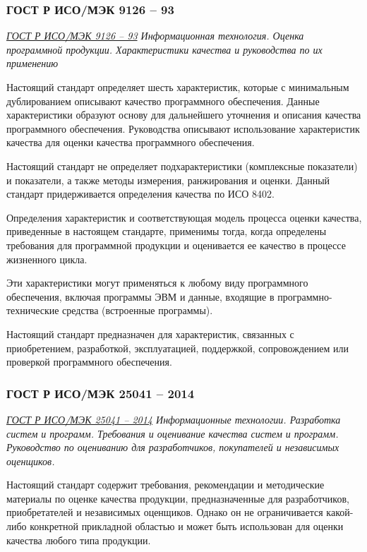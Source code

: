 \subsubsection{ГОСТ Р ИСО/МЭК 9126 -- 93}

\emph{\href{https://docs.cntd.ru/document/1200009076}{ГОСТ Р ИСО/МЭК 9126 -- 93}
Информационная технология.
Оценка программной продукции.
Характеристики качества и руководства по их применению
}

Настоящий стандарт определяет шесть характеристик,
которые с минимальным дублированием описывают качество программного обеспечения.
Данные характеристики образуют основу для дальнейшего уточнения
и описания качества программного обеспечения.
Руководства описывают использование характеристик качества
для оценки качества программного обеспечения.

Настоящий стандарт не определяет подхарактеристики (комплексные показатели)
и показатели, а также методы измерения, ранжирования и оценки.
Данный стандарт придерживается определения качества по ИСО 8402.

Определения характеристик и соответствующая модель процесса оценки качества,
приведенные в настоящем стандарте, применимы тогда,
когда определены требования для программной продукции
и оценивается ее качество в процессе жизненного цикла.

Эти характеристики могут применяться к любому виду программного обеспечения,
включая программы ЭВМ и данные,
входящие в программно-технические средства (встроенные программы).

Настоящий стандарт предназначен для характеристик,
связанных с приобретением, разработкой, эксплуатацией, поддержкой,
сопровождением или проверкой программного обеспечения.

\subsubsection{ГОСТ Р ИСО/МЭК 25041 -- 2014}

\emph{\href{https://docs.cntd.ru/document/1200111122}
{ГОСТ Р ИСО/МЭК 25041 -- 2014}
Информационные технологии.
Разработка систем и программ.
Требования и оценивание качества систем и программ.
Руководство по оцениванию для разработчиков, покупателей и независимых оценщиков.
}

Настоящий стандарт содержит требования,
рекомендации и методические материалы по оценке качества продукции,
предназначенные для разработчиков, приобретателей и независимых оценщиков.
Однако он не ограничивается какой-либо конкретной прикладной областью
и может быть использован для оценки качества любого типа продукции.

